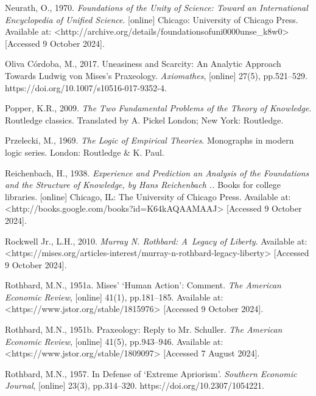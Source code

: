 Neurath, O., 1970. \textit{Foundations of the Unity of Science: Toward an International Encyclopedia of Unified Science}. [online] Chicago: University of Chicago Press. Available at: {\textless}http://archive.org/details/foundationsofuni0000unse\_k8w0{\textgreater} [Accessed 9 October 2024].



Oliva Córdoba, M., 2017. Uneasiness and Scarcity: An Analytic Approach Towards Ludwig von Mises's Praxeology. \textit{Axiomathes}, [online] 27(5), pp.521–529. https://doi.org/10.1007/s10516-017-9352-4.



Popper, K.R., 2009. \textit{The Two Fundamental Problems of the Theory of Knowledge}. Routledge classics. Translated by A. Pickel London; New York: Routledge.



Przelecki, M., 1969. \textit{The Logic of Empirical Theories}. Monographs in modern logic series. London: Routledge \& K. Paul.



Reichenbach, H., 1938. \textit{Experience and Prediction an Analysis of the Foundations and the Structure of Knowledge, by Hans Reichenbach ..} Books for college libraries. [online] Chicago, IL: The University of Chicago Press. Available at: {\textless}http://books.google.com/books?id=K64kAQAAMAAJ{\textgreater} [Accessed 9 October 2024].



Rockwell Jr., L.H., 2010. \textit{Murray N. Rothbard: A~Legacy of Liberty}. Available at: {\textless}https://mises.org/articles-interest/murray-n-rothbard-legacy-liberty{\textgreater} [Accessed 9 October 2024].



Rothbard, M.N., 1951a. Mises' ‘Human Action': Comment. \textit{The American Economic Review}, [online] 41(1), pp.181–185. Available at: {\textless}https://www.jstor.org/stable/1815976{\textgreater} [Accessed 9 October 2024].



Rothbard, M.N., 1951b. Praxeology: Reply to Mr. Schuller. \textit{The American Economic Review}, [online] 41(5), pp.943–946. Available at: {\textless}https://www.jstor.org/stable/1809097{\textgreater} [Accessed 7 August 2024].



Rothbard, M.N., 1957. In Defense of ‘Extreme Apriorism'. \textit{Southern Economic Journal}, [online] 23(3), pp.314–320. https://doi.org/10.2307/1054221.



